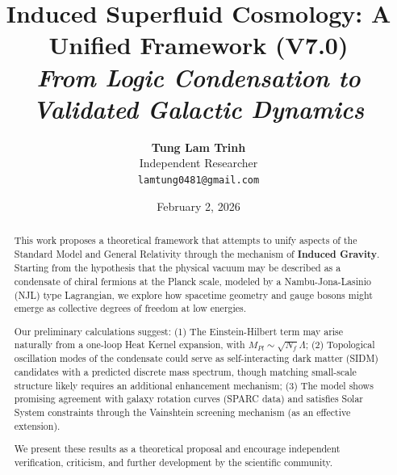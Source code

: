 \documentclass[a4paper,12pt]{article}
\title{\textbf{Induced Superfluid Cosmology: A Unified Framework (V7.0)}\\ \large \textit{From Logic Condensation to Validated Galactic Dynamics}}
\author{\textbf{Tung Lam Trinh} \\ Independent Researcher \\ \texttt{lamtung0481@gmail.com}}
\date{February 2, 2026}
\begin{document}
\maketitle

\begin{abstract}
This work proposes a theoretical framework that attempts to unify aspects of the Standard Model and General Relativity through the mechanism of \textbf{Induced Gravity}. Starting from the hypothesis that the physical vacuum may be described as a condensate of chiral fermions at the Planck scale, modeled by a Nambu-Jona-Lasinio (NJL) type Lagrangian, we explore how spacetime geometry and gauge bosons might emerge as collective degrees of freedom at low energies.

Our preliminary calculations suggest: (1) The Einstein-Hilbert term may arise naturally from a one-loop Heat Kernel expansion, with $M_{Pl} \sim \sqrt{N_f} \Lambda$; (2) Topological oscillation modes of the condensate could serve as self-interacting dark matter (SIDM) candidates with a predicted discrete mass spectrum, though matching small-scale structure likely requires an additional enhancement mechanism; (3) The model shows promising agreement with galaxy rotation curves (SPARC data) and satisfies Solar System constraints through the Vainshtein screening mechanism (as an effective extension).

We present these results as a theoretical proposal and encourage independent verification, criticism, and further development by the scientific community.


\end{abstract}
\end{document}
